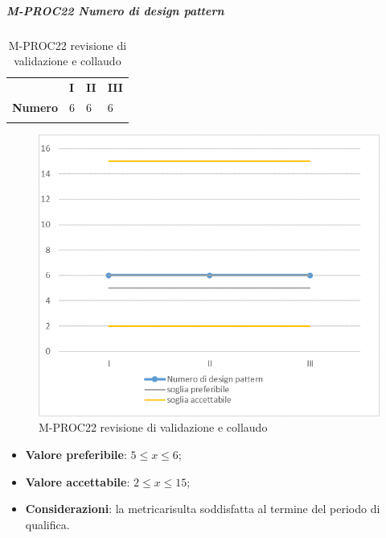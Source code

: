 \subparagraph{M-PROC22 Numero di design pattern} \mbox{}
\begin{longtable}[H!] {						
		>{}p{50mm}  		
		>{}p{8mm}
		>{}p{8mm}		
		>{}p{8mm}		
	}
	\rowcolor{gray!50}
	\textbf{} & \textbf{I} & \textbf{II} & \textbf{III} \TBstrut \\ [2mm]
	\textbf{Numero} & 6 & 6 & 6 \TBstrut \\ [2mm]
	\rowcolor{white}
	\caption{M-PROC22 revisione di validazione e collaudo}
\end{longtable}
\begin{figure}[H] 	
	\includegraphics[width=\linewidth]{./img/grafici/RA22.png}	
	\caption{M-PROC22 revisione di validazione e collaudo}	
\end{figure}
\begin{itemize}
	\item \textbf{Valore preferibile}: $5\le x \le 6$;
	\item \textbf{Valore accettabile}: $2 \le x \le 15$;
	\item \textbf{Considerazioni}: la metrica\glosp risulta soddisfatta al termine del periodo di qualifica.
\end{itemize}
